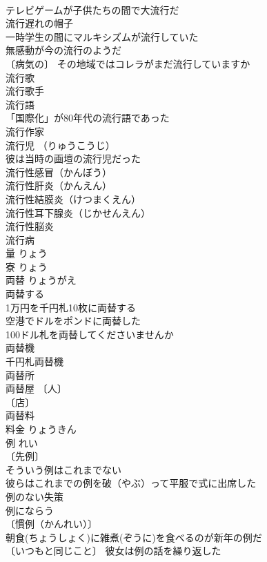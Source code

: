 \documentclass[8pt]{extreport}
\begin{document}
\begin{CJK}{UTF8}{min}
\\	テレビゲームが子供たちの間で大流行だ 
\\	流行遅れの帽子 
\\	一時学生の間にマルキシズムが流行していた 
\\	無感動が今の流行のようだ 
\\	〔病気の〕 その地域ではコレラがまだ流行していますか 
\\	流行歌 
\\	流行歌手 
\\	流行語 
\\	「国際化」が80年代の流行語であった 
\\	流行作家 
\\	流行児 （りゅうこうじ） 
\\	彼は当時の画壇の流行児だった 
\\	流行性感冒（かんぼう） 
\\	流行性肝炎（かんえん） 
\\	流行性結膜炎（けつまくえん） 
\\	流行性耳下腺炎（じかせんえん） 
\\	流行性脳炎 
\\	流行病 
\\	量	りょう	
\\	寮	りょう	
\\	両替	りょうがえ	
\\	両替する 
\\	1万円を千円札10枚に両替する 
\\	空港でドルをポンドに両替した 
\\	100ドル札を両替してくださいませんか 
\\	両替機 
\\	千円札両替機 
\\	両替所 
\\	両替屋 〔人〕
\\	〔店〕
\\	両替料 
\\	料金	りょうきん	
\\	例	れい	
\\	〔先例〕
\\	そういう例はこれまでない 
\\	彼らはこれまでの例を破（やぶ）って平服で式に出席した 
\\	例のない失策 
\\	例にならう 
\\	〔慣例（かんれい）〕
\\	朝食(ちょうしょく)に雑煮(ぞうに)を食べるのが新年の例だ 
\\	〔いつもと同じこと〕 彼女は例の話を繰り返した 

\end{CJK}
\end{document}

